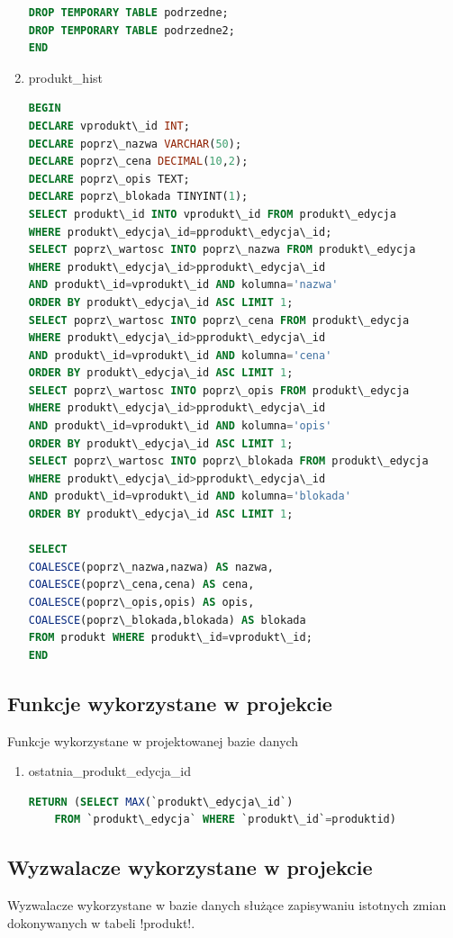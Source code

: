 \begin{enumerate}
\begin{lstlisting}[language=SQL]
DROP TEMPORARY TABLE podrzedne;
DROP TEMPORARY TABLE podrzedne2;
END
\end{lstlisting}
\item produkt\_hist
\begin{lstlisting}[language=SQL]
BEGIN
DECLARE vprodukt\_id INT;
DECLARE poprz\_nazwa VARCHAR(50);
DECLARE poprz\_cena DECIMAL(10,2);
DECLARE poprz\_opis TEXT;
DECLARE poprz\_blokada TINYINT(1);
SELECT produkt\_id INTO vprodukt\_id FROM produkt\_edycja 
WHERE produkt\_edycja\_id=pprodukt\_edycja\_id;
SELECT poprz\_wartosc INTO poprz\_nazwa FROM produkt\_edycja 
WHERE produkt\_edycja\_id>pprodukt\_edycja\_id 
AND produkt\_id=vprodukt\_id AND kolumna='nazwa' 
ORDER BY produkt\_edycja\_id ASC LIMIT 1;
SELECT poprz\_wartosc INTO poprz\_cena FROM produkt\_edycja 
WHERE produkt\_edycja\_id>pprodukt\_edycja\_id 
AND produkt\_id=vprodukt\_id AND kolumna='cena' 
ORDER BY produkt\_edycja\_id ASC LIMIT 1;
SELECT poprz\_wartosc INTO poprz\_opis FROM produkt\_edycja 
WHERE produkt\_edycja\_id>pprodukt\_edycja\_id 
AND produkt\_id=vprodukt\_id AND kolumna='opis' 
ORDER BY produkt\_edycja\_id ASC LIMIT 1;
SELECT poprz\_wartosc INTO poprz\_blokada FROM produkt\_edycja 
WHERE produkt\_edycja\_id>pprodukt\_edycja\_id 
AND produkt\_id=vprodukt\_id AND kolumna='blokada' 
ORDER BY produkt\_edycja\_id ASC LIMIT 1;

SELECT 
COALESCE(poprz\_nazwa,nazwa) AS nazwa, 
COALESCE(poprz\_cena,cena) AS cena, 
COALESCE(poprz\_opis,opis) AS opis, 
COALESCE(poprz\_blokada,blokada) AS blokada 
FROM produkt WHERE produkt\_id=vprodukt\_id; 
END
\end{lstlisting}
\end{enumerate}
\subsection{Funkcje wykorzystane w projekcie}
Funkcje wykorzystane w projektowanej bazie danych

\begin{enumerate}
	\item ostatnia\_produkt\_edycja\_id
	\begin{lstlisting}[language=SQL]
	RETURN (SELECT MAX(`produkt\_edycja\_id`) 
	FROM `produkt\_edycja` WHERE `produkt\_id`=produktid)
	\end{lstlisting}
\end{enumerate}

\subsection{Wyzwalacze wykorzystane w projekcie}
Wyzwalacze wykorzystane w bazie danych służące zapisywaniu istotnych zmian dokonywanych w tabeli \s!produkt!.

